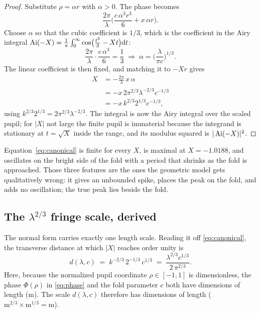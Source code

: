 \begin{proof}
Substitute $\rho = \alpha r$ with $\alpha > 0$. The phase becomes
\begin{equation}
\frac{2\pi}{\lambda}\Big( \frac{c\,\alpha^3 r^3}{6} + x\,\alpha r \Big).
\end{equation}
Choose $\alpha$ so that the cubic coefficient is $1/3$, which is the coefficient
in the Airy integral $\operatorname{Ai}(-X) = \frac{1}{\pi}\int_0^\infty \cos\!\big(\tfrac{t^3}{3}
- Xt\big)\mathrm{d} t$:
\begin{equation}
\frac{2\pi}{\lambda}\cdot\frac{c\,\alpha^3}{6} = \frac13
\;\Longrightarrow\;
\alpha = \Big(\frac{\lambda}{\pi c}\Big)^{1/3}.
\end{equation}
The linear coefficient is then fixed, and matching it to $-X r$ gives
\begin{equation}
\begin{split}
X &= -\frac{2\pi}{\lambda}\,x\,\alpha \\
  &= -x\,2\pi^{2/3}\lambda^{-2/3}c^{-1/3} \\
  &= -x\,k^{2/3}2^{1/3}c^{-1/3},
\end{split}
\end{equation}
using $k^{2/3}2^{1/3} = 2\pi^{2/3}\lambda^{-2/3}$. The integral is now the Airy
integral over the scaled pupil; for $|X|$ not large the finite pupil is
immaterial because the integrand is stationary at $t = \sqrt{X}$ inside the
range, and its modulus squared is $|\operatorname{Ai}(-X)|^2$.
\end{proof}

Equation~\eqref{eq:canonical} is finite for every $X$, is maximal at
$X = -1.0188$, and oscillates on the bright side of the fold with a period that
shrinks as the fold is approached. Those three features are the ones the
geometric model gets qualitatively wrong: it gives an unbounded spike, places the peak on the fold, and adds no oscillation; the true peak lies beside the fold.

\subsection{The ${\lambda^{2/3}}$ fringe scale, derived}
\label{sec:scaling}

The normal form carries exactly one length scale. Reading it off
\eqref{eq:canonical}, the transverse distance at which $|X|$ reaches order unity
is
\begin{equation}
d(\lambda,c) \;=\; k^{-2/3}\,2^{-1/3}\,c^{1/3}
\;=\; \frac{\lambda^{2/3}c^{1/3}}{2\,\pi^{2/3}} .
\label{eq:scalelaw}
\end{equation}
Here, because the normalized pupil coordinate $\rho \in [-1,1]$ is dimensionless,
the phase $\Phi(\rho)$ in \eqref{eq:phase} and the fold parameter $c$ both have
dimensions of length ($\si{\meter}$). The scale $d(\lambda,c)$ therefore has dimensions
of length ($\si{\meter}^{2/3} \times \si{\meter}^{1/3} = \si{\meter}$).

